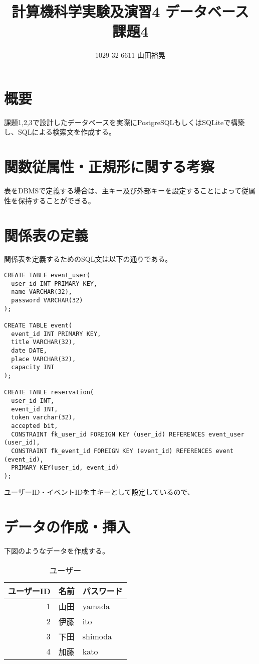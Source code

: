 \documentclass[dvipdfmx]{jarticle}
\begin{document}
\title{計算機科学実験及演習4 データベース 課題4}
\author{1029-32-6611 山田裕晃}
\maketitle

\section{概要}
課題1,2,3で設計したデータベースを実際にPostgreSQLもしくはSQLiteで構築し、SQLによる検索文を作成する。

\section{関数従属性・正規形に関する考察}

表をDBMSで定義する場合は、主キー及び外部キーを設定することによって従属性を保持することができる。


\section{関係表の定義}

関係表を定義するためのSQL文は以下の通りである。

\begin{lstlisting}[caption=definition]
CREATE TABLE event_user(
  user_id INT PRIMARY KEY,
  name VARCHAR(32),
  password VARCHAR(32)
);

CREATE TABLE event(
  event_id INT PRIMARY KEY,
  title VARCHAR(32),
  date DATE,
  place VARCHAR(32),
  capacity INT
);

CREATE TABLE reservation(
  user_id INT,
  event_id INT,
  token varchar(32),
  accepted bit,
  CONSTRAINT fk_user_id FOREIGN KEY (user_id) REFERENCES event_user (user_id),
  CONSTRAINT fk_event_id FOREIGN KEY (event_id) REFERENCES event (event_id),
  PRIMARY KEY(user_id, event_id)
);
\end{lstlisting}

ユーザーID・イベントIDを主キーとして設定しているので、

\section{データの作成・挿入}

下図のようなデータを作成する。

\begin{table}[H]
  \centering
   \begin{tabular}{|r|l|l|}
    \hline
    ユーザーID & 名前 & パスワード \\
    \hline \hline
    1 & 山田 & yamada \\
    2 & 伊藤 & ito \\
    3 & 下田 & shimoda \\
    4 & 加藤 & kato \\
    \hline
  \end{tabular}
  \caption{ユーザー}
\end{table}
\end{document}
